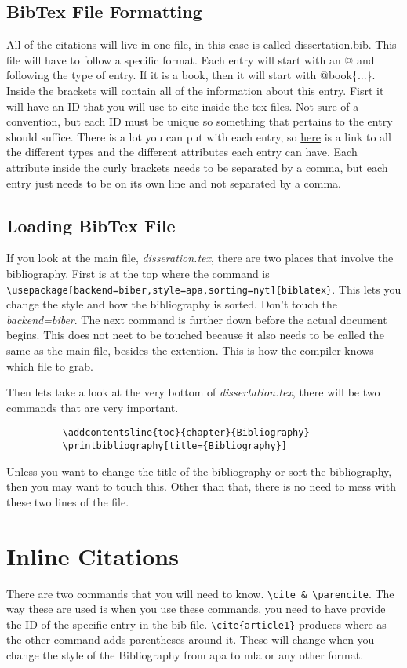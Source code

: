 \documentclass[./dissertation.tex]{subfiles}
\begin{document}
      \subsection{BibTex File Formatting}
        All of the citations will live in one file, in this case is called dissertation.bib. This file will have to follow a specific format. Each entry will start with an @ and following the type of entry. If it is a book, then it will start with @book\{...\}. Inside the brackets will contain all of the information about this entry. Fisrt it will have an ID that you will use to cite inside the tex files. Not sure of a convention, but each ID must be unique so something that pertains to the entry should suffice. There is a lot you can put with each entry, so \href{https://www2.cs.arizona.edu/~collberg/Teaching/07.231/BibTeX/bibtex.html}{here} is a link to all the different types and the different attributes each entry can have. Each attribute inside the curly brackets needs to be separated by a comma, but each entry just needs to be on its own line and not separated by a comma.
      \subsection{Loading BibTex File}
        If you look at the main file, \textit{disseration.tex}, there are two places that involve the bibliography. First is at the top where the command is \verb+\usepackage[backend=biber,style=apa,sorting=nyt]{biblatex}+. This lets you change the style and how the bibliography is sorted. Don't touch the \textit{backend=biber}. The next command is \verb++ further down before the actual document begins. This does not neet to be touched because it also needs to be called the same as the main file, besides the extention. This is how the compiler knows which file to grab.

        Then lets take a look at the very bottom of \textit{dissertation.tex}, there will be two commands that are very important.
        \begin{verbatim}
          \addcontentsline{toc}{chapter}{Bibliography}
          \printbibliography[title={Bibliography}]
        \end{verbatim}
        Unless you want to change the title of the bibliography or sort the bibliography, then you may want to touch this. Other than that, there is no need to mess with these two lines of the file.

    \section{Inline Citations}
    There are two commands that you will need to know. \verb+\cite & \parencite+. The way these are used is when you use these commands, you need to have provide the ID of the specific entry in the bib file. \verb+\cite{article1}+ produces \cite{article1} where as the other command adds parentheses around it. These will change when you change the style of the Bibliography from apa to mla or any other format.
    \parencite{article1}
    \parencite{article2}
\end{document}

